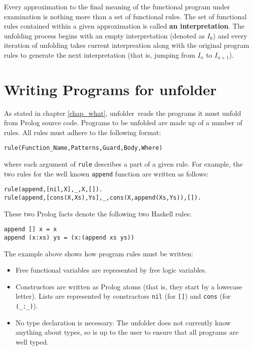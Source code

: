 \documentclass[11pt,a4paper,twoside,openright]{book}
\newcommand{\unfolder}{{\textsf{unfolder~}}}
\begin{document}
Every approximation to the final meaning of the functional program
under examination is nothing more than a set of functional rules. The
set of functional rules contained within a given approximation is
called {\bf an interpretation}. The unfolding process begins with an
empty interpretation (denoted as $I_0$) and every iteration of
unfolding takes current interpreation along with the original program
rules to generate the next interpretation (that is, jumping from $I_n$
to $I_{n+1}$). 

\chapter{Writing Programs for \unfolder}
\label{chap_writing_programs}

As stated in chapter \ref{chap_what}, \unfolder reads the programs it
must unfold from Prolog source code. Programs to be unfolded are made
up of a number of rules. All rules must adhere to the following
format:

\begin{center}
{\tt rule(Function\_Name,Patterns,Guard,Body,Where)}
\end{center}

\noindent
where each argument of {\tt rule} describes a part of a given
rule. For example, the two rules for the well known {\tt append}
function are written as follows:

\begin{verbatim}
rule(append,[nil,X],_,X,[]).
rule(append,[cons(X,Xs),Ys],_,cons(X,append(Xs,Ys)),[]).
\end{verbatim} 

\noindent
These two Prolog facts denote the following two Haskell rules:

\begin{verbatim}
append [] x = x
append (x:xs) ys = (x:(append xs ys))
\end{verbatim}

\noindent
The example above shows how program rules must be written:

\begin{itemize}
\item
Free functional variables are represented by free logic variables.

\item
Constructors are written as Prolog atoms (that is, they start by a
lowecase letter). Lists are represented by constractors {\tt nil} (for
{\tt []}) and {\tt cons} (for {\tt (\_:\_)}).

\item
No type declaration is necessary. The unfolder does not currently know
anything about types, so is up to the user to ensure that all programs
are well typed.
\end{itemize}
\end{document}
